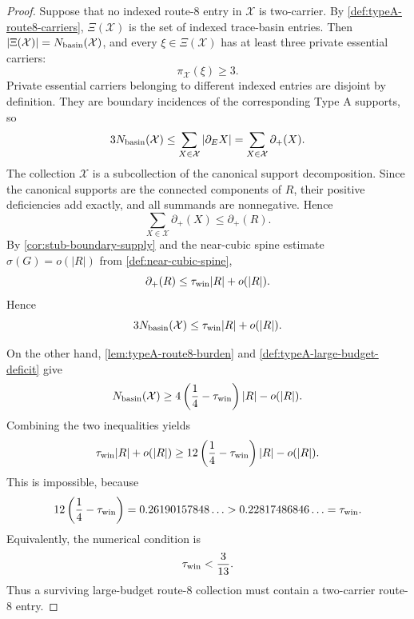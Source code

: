 \documentclass[11pt]{article}
\newcommand{\defp}{\partial_+}
\begin{document}
\begin{proof}
	Suppose that no indexed route-8 entry in $\mathcal X$ is two-carrier.  By
	\cref{def:typeA-route8-carriers}, \(\Xi(\mathcal X)\) is the set of indexed
	trace-basin entries.  Then
$|\Xi(\mathcal X)|=N_{\rm basin}(\mathcal X)$, and every
$\xi\in\Xi(\mathcal X)$ has at least three private essential carriers:
\[
\pi_{\mathcal X}(\xi)\ge3.
\]
Private essential carriers belonging to different indexed entries are disjoint
by definition.  They are boundary incidences of the corresponding Type A
supports, so
\[
3N_{\rm basin}(\mathcal X)
\le
\sum_{X\in\mathcal X}|\partial_E X|
=
\sum_{X\in\mathcal X}\defp(X).
\]
The collection $\mathcal X$ is a subcollection of the canonical support
decomposition.  Since the canonical supports are the connected components of
\(R\), their positive deficiencies add exactly, and all summands are
nonnegative.  Hence
\[
\sum_{X\in\mathcal X}\defp(X)
\le
\defp(R).
\]
By \cref{cor:stub-boundary-supply} and the near-cubic spine estimate
\(\sigma(G)=o(|R|)\) from \cref{def:near-cubic-spine},
\[
\defp(R)\le\tau_{\rm win}|R|+o(|R|).
\]
Hence
\[
3N_{\rm basin}(\mathcal X)
\le
\tau_{\rm win}|R|+o(|R|).
\]

On the other hand, \cref{lem:typeA-route8-burden} and
\cref{def:typeA-large-budget-deficit} give
\[
N_{\rm basin}(\mathcal X)
\ge
4\left(\frac14-\tau_{\rm win}\right)|R|-o(|R|).
\]
Combining the two inequalities yields
\[
\tau_{\rm win}|R|+o(|R|)
\ge
12\left(\frac14-\tau_{\rm win}\right)|R|-o(|R|).
\]
This is impossible, because
\[
12\left(\frac14-\tau_{\rm win}\right)
=0.26190157848\ldots
>
0.22817486846\ldots
=\tau_{\rm win}.
\]
Equivalently, the numerical condition is
\[
\tau_{\rm win}<\frac3{13}.
\]
Thus a surviving large-budget route-8 collection must contain a two-carrier
route-8 entry.
\end{proof}
\end{document}
